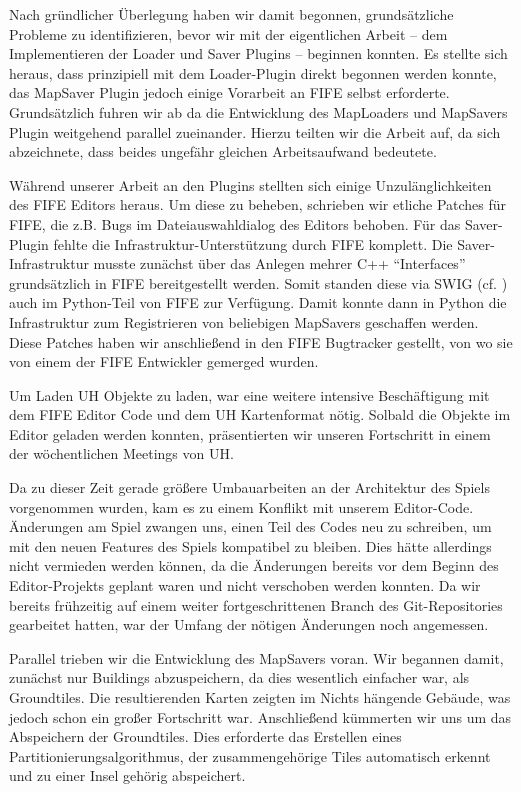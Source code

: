 Nach gründlicher Überlegung haben wir damit begonnen, grundsätzliche Probleme zu
identifizieren, bevor wir mit der eigentlichen Arbeit -- dem Implementieren der
Loader und Saver Plugins -- beginnen konnten. Es stellte sich heraus, dass
prinzipiell mit dem Loader-Plugin direkt begonnen werden konnte, das MapSaver
Plugin jedoch einige Vorarbeit an FIFE selbst erforderte. Grundsätzlich fuhren
wir ab da die Entwicklung des MapLoaders und MapSavers Plugin weitgehend
parallel zueinander. Hierzu teilten wir die Arbeit auf, da sich abzeichnete,
dass beides ungefähr gleichen Arbeitsaufwand bedeutete.

Während unserer Arbeit an den Plugins stellten sich einige Unzulänglichkeiten
des FIFE Editors heraus. Um diese zu beheben, schrieben wir etliche Patches für
FIFE, die z.B.
Bugs im Dateiauswahldialog des Editors behoben. Für das Saver-Plugin fehlte die
Infrastruktur-Unterstützung durch FIFE komplett. Die Saver-Infrastruktur musste
zunächst über das Anlegen mehrer C++ ``Interfaces'' grundsätzlich in FIFE
bereitgestellt werden. Somit standen diese via SWIG (cf.
\cite{swig}) auch im Python-Teil von FIFE zur Verfügung. Damit konnte dann in
Python die Infrastruktur zum Registrieren von beliebigen MapSavers geschaffen
werden. Diese Patches haben wir anschließend in den FIFE Bugtracker gestellt,
von wo sie von einem der FIFE Entwickler gemerged wurden.


Um Laden UH Objekte zu laden, war eine weitere intensive Beschäftigung mit dem
FIFE Editor Code und dem UH Kartenformat nötig. Solbald die Objekte im Editor
geladen werden konnten, präsentierten wir unseren Fortschritt in einem der
wöchentlichen Meetings von UH.

Da zu dieser Zeit gerade größere Umbauarbeiten an der Architektur des Spiels vorgenommen wurden,
kam es zu einem Konflikt mit unserem Editor-Code. Änderungen am Spiel zwangen uns, einen Teil
des Codes neu zu schreiben, um mit den neuen Features des Spiels kompatibel zu bleiben. Dies
hätte allerdings nicht vermieden werden können, da die Änderungen bereits vor dem Beginn des
Editor-Projekts geplant waren und nicht verschoben werden konnten. Da wir bereits frühzeitig
auf einem weiter fortgeschrittenen Branch des Git-Repositories gearbeitet hatten, war der
Umfang der nötigen Änderungen noch angemessen.


Parallel trieben wir die Entwicklung des MapSavers voran. Wir begannen damit,
zunächst nur Buildings abzuspeichern, da dies wesentlich einfacher war, als
Groundtiles. Die resultierenden Karten zeigten im Nichts hängende Gebäude, was
jedoch schon ein großer Fortschritt war.
Anschließend kümmerten wir uns um das Abspeichern der Groundtiles. Dies
erforderte das Erstellen eines Partitionierungsalgorithmus, der zusammengehörige
Tiles automatisch erkennt und zu einer Insel gehörig abspeichert.

